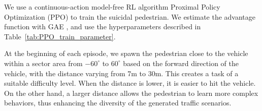 \documentclass[letterpaper, 10 pt, conference]{ieeeconf}
\begin{document}
We use a continuous-action model-free RL algorithm Proximal Policy Optimization (PPO) \cite{PPO} to train the suicidal pedestrian.
We estimate the advantage function %
with GAE \cite{gae}, and use the hyperparameters described in Table~\ref{tab:PPO_train_parameter}.



At the beginning of each episode, we spawn the pedestrian close to the vehicle within a sector area from $-60^{\circ}$ to $60^{\circ}$ based on the forward direction of the vehicle, with the distance varying from 7m to 30m. This creates a task of a suitable difficulty level. When the distance is lower, it is easier to hit the vehicle. On the other hand, a larger distance allows the pedestrian to learn more complex behaviors, thus enhancing the diversity of the generated traffic scenarios.
\end{document}
